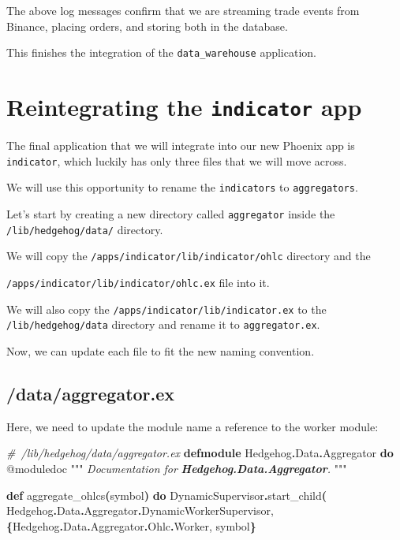 \documentclass[
  oneside]{book}
\newenvironment{Shaded}{\begin{snugshade}}{\end{snugshade}}
\newcommand{\CommentTok}[1]{\textcolor[rgb]{0.56,0.35,0.01}{\textit{#1}}}
\newcommand{\ConstantTok}[1]{\textcolor[rgb]{0.56,0.35,0.01}{#1}}
\newcommand{\FunctionTok}[1]{\textcolor[rgb]{0.13,0.29,0.53}{\textbf{#1}}}
\newcommand{\InformationTok}[1]{\textcolor[rgb]{0.56,0.35,0.01}{\textbf{\textit{#1}}}}
\newcommand{\KeywordTok}[1]{\textcolor[rgb]{0.13,0.29,0.53}{\textbf{#1}}}
\newcommand{\NormalTok}[1]{#1}
\newcommand{\OperatorTok}[1]{\textcolor[rgb]{0.81,0.36,0.00}{\textbf{#1}}}
\newcommand{\OtherTok}[1]{\textcolor[rgb]{0.56,0.35,0.01}{#1}}
\begin{document}
The above log messages confirm that we are streaming trade events from Binance, placing orders, and storing both in the database.

This finishes the integration of the \texttt{data\_warehouse} application.

\section{\texorpdfstring{Reintegrating the \texttt{indicator} app}{Reintegrating the indicator app}}\label{reintegrating-the-indicator-app}

The final application that we will integrate into our new Phoenix app is \texttt{indicator}, which luckily has only three files that we will move across.

We will use this opportunity to rename the \texttt{indicators} to \texttt{aggregators}.

Let's start by creating a new directory called \texttt{aggregator} inside the \texttt{/lib/hedgehog/data/} directory.

We will copy the \texttt{/apps/indicator/lib/indicator/ohlc} directory and the

\texttt{/apps/indicator/lib/indicator/ohlc.ex} file into it.

We will also copy the \texttt{/apps/indicator/lib/indicator.ex} to the \texttt{/lib/hedgehog/data} directory and rename it to \texttt{aggregator.ex}.

Now, we can update each file to fit the new naming convention.

\subsection{/data/aggregator.ex}\label{dataaggregator.ex}

Here, we need to update the module name a reference to the worker module:

\begin{Shaded}
\begin{Highlighting}[]
\CommentTok{\# /lib/hedgehog/data/aggregator.ex}
\KeywordTok{defmodule} \ConstantTok{Hedgehog}\OperatorTok{.}\ConstantTok{Data}\OperatorTok{.}\ConstantTok{Aggregator} \KeywordTok{do}
  \OtherTok{@moduledoc """}
\CommentTok{ Documentation for }\InformationTok{\textasciigrave{}Hedgehog.Data.Aggregator\textasciigrave{}}\CommentTok{.}
\CommentTok{ }\OtherTok{"""}

  \KeywordTok{def}\NormalTok{ aggregate\_ohlcs}\FunctionTok{(}\NormalTok{symbol}\FunctionTok{)} \KeywordTok{do}
    \ConstantTok{DynamicSupervisor}\OperatorTok{.}\NormalTok{start\_child}\FunctionTok{(}
      \ConstantTok{Hedgehog}\OperatorTok{.}\ConstantTok{Data}\OperatorTok{.}\ConstantTok{Aggregator}\OperatorTok{.}\ConstantTok{DynamicWorkerSupervisor}\NormalTok{,}
 \FunctionTok{\{}\ConstantTok{Hedgehog}\OperatorTok{.}\ConstantTok{Data}\OperatorTok{.}\ConstantTok{Aggregator}\OperatorTok{.}\ConstantTok{Ohlc}\OperatorTok{.}\ConstantTok{Worker}\NormalTok{, symbol}\FunctionTok{\}}
\end{Highlighting}
\end{Shaded}
\end{document}
